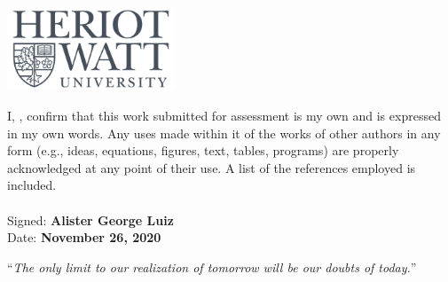 \documentclass[
11pt, %
oneside,
english,
doublespacing, 
nolistspacing,
liststotoc, %
toctotoc, %
parskip, %
headsepline, %
consistentlayout, %
]{COVID-19 Detection - agl2} %
\begin{document}
\begin{titlepage}
\begin{center}
\includegraphics[width=50mm,scale=0.5]{Images/logo.png} %
 

\end{center}
\end{titlepage}


\begin{declaration}
\addchaptertocentry{\authorshipname} %

\noindent I, \textbf{\authorname}, confirm that this work submitted for assessment is my own and is expressed in
my own words. Any uses made within it of the works of other authors in any form (e.g., ideas,
equations, figures, text, tables, programs) are properly acknowledged at any point of their
use. A list of the references employed is included.
\noindent \\\\Signed: \textbf{Alister George Luiz}\\
\noindent Date: \textbf{November 26, 2020}
\end{declaration}

\cleardoublepage


\vspace*{0.2\textheight}

\noindent\enquote{\itshape The only limit to our realization of tomorrow will be our doubts of today.}\bigbreak
\end{document}
